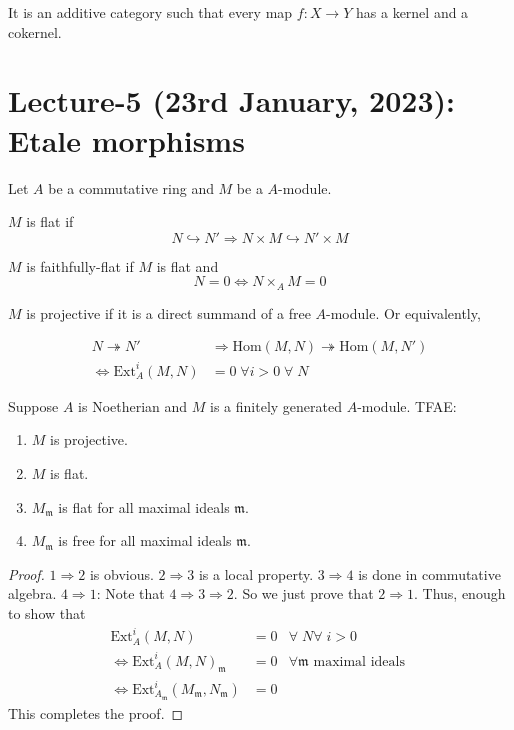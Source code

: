 \documentclass[oneside, 12pt]{scrbook}
\newcommand{\m}{\mathfrak{m}}
\newcommand{\Hom}{\mathrm{Hom}}
\theoremstyle{theorem}
\begin{document}
\begin{definition}
It is an additive category such that every map $f: X \rightarrow Y$ has a kernel and a cokernel.
\end{definition}


\chapter{Lecture-5 (23rd January, 2023): Etale morphisms}

Let $A$ be a commutative ring and $M$ be a $A$-module. 

\begin{definition}
$M$ is flat if $$N \hookrightarrow N' \Rightarrow N \times M \hookrightarrow N' \times M$$
\end{definition}

\begin{definition}
$M$ is faithfully-flat if $M$ is flat and  $$N =0 \Leftrightarrow N \times_{A} M =0$$
\end{definition}

\begin{definition}
$M$ is projective if it is a direct summand of a free $A$-module. Or equivalently,

\begin{align*}
N \twoheadrightarrow N' &\Rightarrow \Hom(M, N) \twoheadrightarrow \Hom(M, N')\\
\Leftrightarrow \mathrm{Ext}_{A}^{i} (M,N) &= 0 \; \forall i >0 \; \forall \; N
\end{align*}
\end{definition}

\begin{lemma}
Suppose $A$ is Noetherian and $M$ is a finitely generated $A$-module. TFAE: 
\begin{enumerate}
\item $M$ is projective.
\item $M$ is flat.
\item $M_{\m}$ is flat for all maximal ideals $\m$.
\item $M_{\m}$ is free for all maximal ideals $\m$.
\end{enumerate}
\end{lemma}

\begin{proof}
$1 \Rightarrow 2$ is obvious. $2\Rightarrow 3$ is a local property. $3 \Rightarrow 4$ is done in commutative algebra. $4 \Rightarrow 1$: Note that $4 \Rightarrow 3 \Rightarrow 2$. So we just prove that $2 \Rightarrow 1$. Thus, enough to show that 
\begin{align*}
\mathrm{Ext}_{A}^i (M,N) &=0 & \forall \; N  \forall \; i>0 \\
\Leftrightarrow \mathrm{Ext}_{A}^i(M,N)_{\m} &= 0 &\forall \m \text{ maximal ideals } \\
\Leftrightarrow \mathrm{Ext}_{A_{\m}}^i (M_{\m}, N_{\m}) &= 0
\end{align*}
This completes the proof.
\end{proof}
\end{document}
